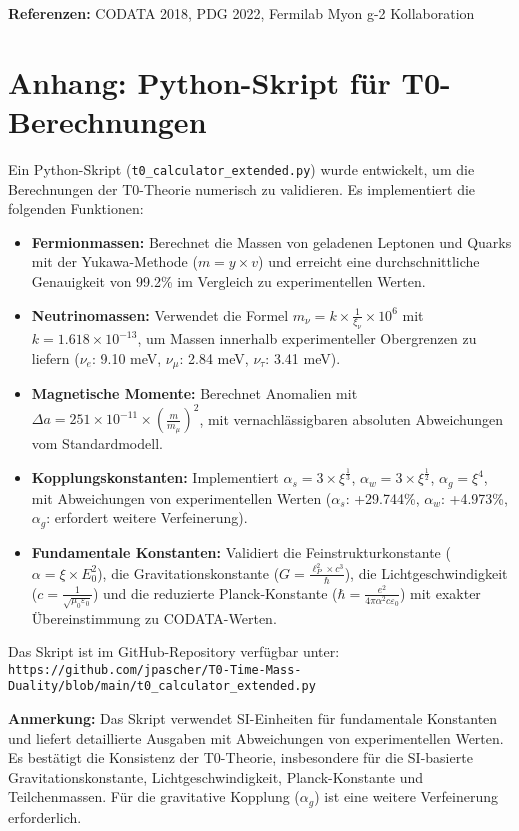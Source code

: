 \documentclass[12pt,a4paper]{article}
\begin{document}
	\textbf{Referenzen:} CODATA 2018, PDG 2022, Fermilab Myon g-2 Kollaboration
	
	\section{Anhang: Python-Skript für T0-Berechnungen}
	
	Ein Python-Skript (\texttt{t0\_calculator\_extended.py}) wurde entwickelt, um die Berechnungen der T0-Theorie numerisch zu validieren. Es implementiert die folgenden Funktionen:
	
	\begin{itemize}
		\item \textbf{Fermionmassen:} Berechnet die Massen von geladenen Leptonen und Quarks mit der Yukawa-Methode (\(m = y \times v\)) und erreicht eine durchschnittliche Genauigkeit von 99.2\% im Vergleich zu experimentellen Werten.
		\item \textbf{Neutrinomassen:} Verwendet die Formel \(m_{\nu} = k \times \frac{1}{\xi_{\nu}} \times 10^6\) mit \(k = 1.618 \times 10^{-13}\), um Massen innerhalb experimenteller Obergrenzen zu liefern (\(\nu_e\): 9.10 meV, \(\nu_\mu\): 2.84 meV, \(\nu_\tau\): 3.41 meV).
		\item \textbf{Magnetische Momente:} Berechnet Anomalien mit \(\Delta a = 251 \times 10^{-11} \times \left(\frac{m}{m_{\mu}}\right)^2\), mit vernachlässigbaren absoluten Abweichungen vom Standardmodell.
		\item \textbf{Kopplungskonstanten:} Implementiert \(\alpha_s = 3 \times \xi^{\frac{1}{3}}\), \(\alpha_w = 3 \times \xi^{\frac{1}{2}}\), \(\alpha_g = \xi^4\), mit Abweichungen von experimentellen Werten (\(\alpha_s\): +29.744\%, \(\alpha_w\): +4.973\%, \(\alpha_g\): erfordert weitere Verfeinerung).
		\item \textbf{Fundamentale Konstanten:} Validiert die Feinstrukturkonstante (\(\alpha = \xi \times E_0^2\)), die Gravitationskonstante (\(G = \frac{\ell_P^2 \times c^3}{\hbar}\)), die Lichtgeschwindigkeit (\( c = \frac{1}{\sqrt{\mu_0 \varepsilon_0}} \)) und die reduzierte Planck-Konstante (\( \hbar = \frac{e^2}{4\pi \alpha^2 c \varepsilon_0} \)) mit exakter Übereinstimmung zu CODATA-Werten.
	\end{itemize}
	
	Das Skript ist im GitHub-Repository verfügbar unter: \\
	\texttt{https://github.com/jpascher/T0-Time-Mass-Duality/blob/main/t0\_calculator\_extended.py}
	
	\textbf{Anmerkung:} Das Skript verwendet SI-Einheiten für fundamentale Konstanten und liefert detaillierte Ausgaben mit Abweichungen von experimentellen Werten. Es bestätigt die Konsistenz der T0-Theorie, insbesondere für die SI-basierte Gravitationskonstante, Lichtgeschwindigkeit, Planck-Konstante und Teilchenmassen. Für die gravitative Kopplung (\(\alpha_g\)) ist eine weitere Verfeinerung erforderlich.
	
\end{document}
